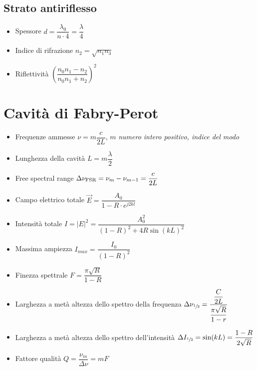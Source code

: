 \documentclass[9pt]{extarticle}
\begin{document}
\subsection{Strato antiriflesso}
\begin{itemize}
  \item Spessore \( d = \dfrac{\lambda_0}{n \cdot 4} = \dfrac{\lambda}{4} \)
  \item Indice di rifrazione \( \displaystyle n_2 = \sqrt{n_1 n_3} \)
  \item Riflettività \( \left( \dfrac{n_0 n_1 - n_2 }{n_0 n_1 + n_ 2} \right) ^ 2 \)
\end{itemize}

\newpage

\section {Cavità di Fabry-Perot}
\begin{itemize}
  \item Frequenze ammesse \(  \nu = m \dfrac{c}{2L} \), \( m \) \textit{numero intero positivo, indice del modo}
  \item Lunghezza della cavità \( L = m \dfrac{\lambda}{2} \)
  \item Free spectral range \( \Delta \nu_{\textnormal{FSR}} = \nu_{m} - \nu_{m-1} = \dfrac{c}{2L} \)
  \item Campo elettrico totale \( \vec{E} = \dfrac{A_0}{1-R \cdot e^ {j 2 k l}} \)
  \item Intensità totale \( I = | E | ^ 2 = \dfrac{A_0^2}{(1-R)^2+ 4 R \sin(kL)^2} \)
  \item Massima ampiezza \( I_{max} = \dfrac{I_0}{(1-R)^2} \)
  \item Finezza spettrale \( F = \dfrac{\pi \sqrt{R}}{1-R} \)
  \item Larghezza a metà altezza dello spettro della frequenza \(\Delta \nu_{\sfrac{1}{2}} = \dfrac{\dfrac{C}{2L}}{\dfrac{\pi \sqrt{R}}{1 - r}} \)
  \item Larghezza a metà altezza dello spettro dell'intensità \(\Delta I_{\sfrac{1}{2}} = \sin(k L) = \dfrac{1 - R}{2 \sqrt{R}} \)
  \item Fattore qualità \( Q = \dfrac{\nu_m}{\Delta \nu} = m F \)
\end{itemize}

\newpage
\end{document}
